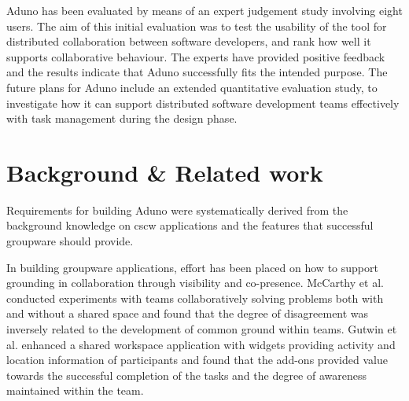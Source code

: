 \documentclass[conference]{IEEEtran}
\begin{document}
Aduno has been evaluated by means of an expert judgement study involving eight users. The aim of this initial evaluation was to test the usability of the tool for distributed collaboration between software developers, and rank how well it supports collaborative behaviour. The experts have provided positive feedback and the results indicate that Aduno successfully fits the intended purpose.  The future plans for Aduno include an extended quantitative evaluation study, to investigate how it can support distributed software development teams effectively with task management during the design phase.



\section{Background \& Related work}
\label{sec:background}

Requirements for building Aduno were systematically derived from the background knowledge on {\sc cscw} applications and the features that successful groupware should provide. 

In building groupware applications, effort has been placed on how to support grounding in collaboration through visibility and co-presence. McCarthy et al. \cite{MCMM91} conducted experiments with teams collaboratively solving problems both with and without a shared space and found that the degree of disagreement was inversely related to the development of common ground within teams. Gutwin et al. \cite{GRG96} enhanced a shared workspace application with widgets providing activity and location information of participants and found that the add-ons provided value towards the successful completion of the tasks and the degree of awareness maintained within the team.
\end{document}
